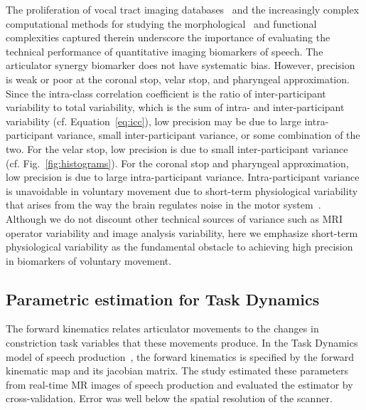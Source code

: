 \documentclass[preprint]{JASAnew}\usepackage[]{graphicx}\usepackage[]{color}
\begin{document}
The proliferation of vocal tract imaging databases~\citep{narayanan2014real,sorensen2017database} and the increasingly complex computational methods for studying the morphological~\citep{lammert2013morphological} and functional~\citep{dawson2016methods} complexities captured therein underscore the importance of evaluating the technical performance of quantitative imaging biomarkers of speech. 
%
The articulator synergy biomarker does not have systematic bias. However, precision is weak or poor at the coronal stop, velar stop, and pharyngeal approximation. 
%
Since the intra-class correlation coefficient is the ratio of inter-participant variability to total
variability, which is the sum of intra- and inter-participant variability (cf. Equation~\ref{eq:icc}), low precision may be due to large intra-participant variance, small inter-participant variance, or some combination of the two. 
%
For the velar stop, low precision is due to small inter-participant variance (cf. Fig.~\ref{fig:histograms}). 
%
For the coronal stop and pharyngeal approximation, low precision is due to large intra-participant variance.
%
Intra-participant variance is unavoidable in voluntary movement due to short-term physiological variability that arises from the way the brain regulates noise in the motor system~\citep{harris1998signal,van2009motor,wu2014temporal}. 
%
Although we do not discount other technical sources of variance such as MRI operator variability and image analysis variability, here we emphasize short-term physiological variability as the fundamental obstacle to achieving high precision in biomarkers of voluntary movement.





\subsection{Parametric estimation for Task Dynamics}



The forward kinematics relates articulator movements to the changes in constriction task variables that these movements produce. 
%
In the Task Dynamics model of speech production~\citep{saltzman1989dynamical}, the forward kinematics is specified by the forward kinematic map and its jacobian matrix. 
%
The study estimated these parameters from real-time MR images of speech production and evaluated the estimator by cross-validation. Error was well below the spatial resolution of the scanner.
\end{document}
